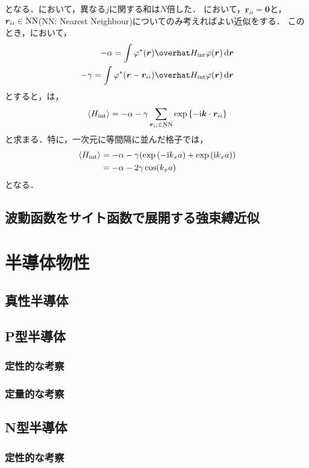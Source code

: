 \documentclass{report}
\begin{document}
      となる．において，異なる$j$に関する和は$N$倍した．
      において，$\bm{r}_{ii} = \bm{0}$と，$\bm{r}_{ii} \in \mathrm{NN}$(NN: Nearest Neighbour)についてのみ考えればよい近似をする．
      このとき，において，
      \begin{align}
        -\alpha = \int \phi^*(\bm{r})\hat{H}_{\r{int}}\phi(\bm{r})\dd{\bm{r}} \\ 
        -\gamma = \int \phi^*(\bm{r} - \bm{r}_{ii})\hat{H}_{\r{int}}\phi(\bm{r})\dd{\bm{r}}
      \end{align}
      とすると，は，
      \begin{align}
        \ev{H_{\r{int}}} = -\alpha -\gamma\sum_{\bm{r}_{ii} \in \r{NN}} \exp\qty{-\i\bm{k}\cdot\bm{r}_{ii}}
      \end{align}
      と求まる．特に，一次元に等間隔に並んだ格子では，
      \begin{align}
        \ev{H_{\r{int}}} &= -\alpha - \gamma\qty(\exp\qty(-\i k_xa) + \exp\qty(\i k_xa)) \\ 
        &= -\alpha - 2\gamma\cos(k_xa)
      \end{align}
      となる．
    \section{波動函数をサイト函数で展開する強束縛近似}
  \chapter{半導体物性}
    \section{真性半導体}
    \section{P型半導体}
      \subsection{定性的な考察}
      \subsection{定量的な考察}
    \section{N型半導体}
      \subsection{定性的な考察}
\end{document}
